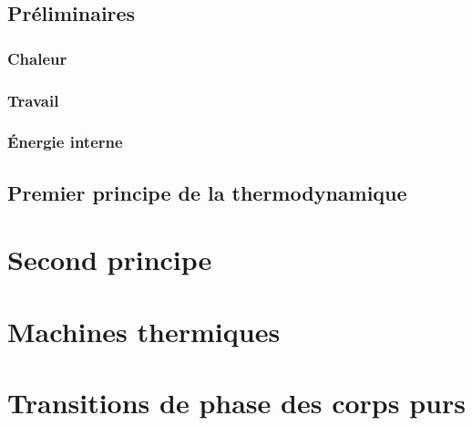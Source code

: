 \section{Préliminaires}
\subsection{Chaleur}
\subsection{Travail}
\subsection{Énergie interne}
\section{Premier principe de la thermodynamique}
\chapter{Second principe}
\chapter{Machines thermiques}
\chapter{Transitions de phase des corps purs}